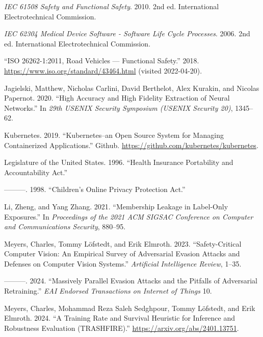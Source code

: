 \documentclass[
]{article}
\newlength{\cslhangindent}
\newlength{\cslentryspacingunit} %
\newenvironment{CSLReferences}[2] %
 {%
  \setlength{\parindent}{0pt}
  \ifodd #1
  \let\oldpar\par
  \def\par{\hangindent=\cslhangindent\oldpar}
  \fi
  \setlength{\parskip}{#2\cslentryspacingunit}
 }%
 {}
\begin{document}
\begin{CSLReferences}{1}{0}
\leavevmode{}%
\emph{IEC 61508 Safety and Functional Safety}. 2010. 2nd ed.
International Electrotechnical Commission.

\leavevmode{}%
\emph{IEC 62304 Medical Device Software - Software Life Cycle
Processes}. 2006. 2nd ed. International Electrotechnical Commission.

\leavevmode{}%
{``{ISO} 26262-1:2011, Road Vehicles --- Functional Safety.''} 2018.
\url{https://www.iso.org/standard/43464.html} (visited 2022-04-20).

\leavevmode{}%
Jagielski, Matthew, Nicholas Carlini, David Berthelot, Alex Kurakin, and
Nicolas Papernot. 2020. {``High Accuracy and High Fidelity Extraction of
Neural Networks.''} In \emph{29th USENIX Security Symposium (USENIX
Security 20)}, 1345--62.

\leavevmode{}%
Kubernetes. 2019. {``Kubernetes--an Open Source System for Managing
Containerized Applications.''} Github.
\url{https://github.com/kubernetes/kubernetes}.

\leavevmode{}%
Legislature of the United States. 1996. {``Health Insurance Portability
and Accountability Act.''}

\leavevmode{}%
---------. 1998. {``Children's Online Privacy Protection Act.''}

\leavevmode{}%
Li, Zheng, and Yang Zhang. 2021. {``Membership Leakage in Label-Only
Exposures.''} In \emph{Proceedings of the 2021 ACM SIGSAC Conference on
Computer and Communications Security}, 880--95.

\leavevmode{}%
Meyers, Charles, Tommy Löfstedt, and Erik Elmroth. 2023.
{``Safety-Critical Computer Vision: An Empirical Survey of Adversarial
Evasion Attacks and Defenses on Computer Vision Systems.''}
\emph{Artificial Intelligence Review}, 1--35.

\leavevmode{}%
---------. 2024. {``Massively Parallel Evasion Attacks and the Pitfalls
of Adversarial Retraining.''} \emph{EAI Endorsed Transactions on
Internet of Things} 10.

\leavevmode{}%
Meyers, Charles, Mohammad Reza Saleh Sedghpour, Tommy Löfstedt, and Erik
Elmroth. 2024. {``A Training Rate and Survival Heuristic for Inference
and Robustness Evaluation (TRASHFIRE).''}
\url{https://arxiv.org/abs/2401.13751}.


\end{CSLReferences}
\end{document}
